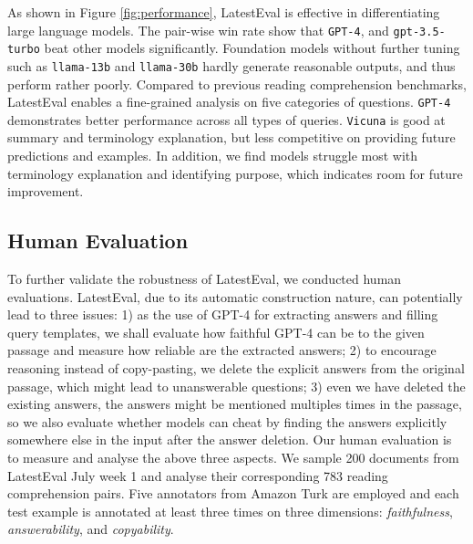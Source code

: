 \documentclass[letterpaper]{article} %
\begin{document}
As shown in Figure \ref{fig:performance}, LatestEval is effective in differentiating large language models. The pair-wise win rate show that \texttt{GPT-4}, and \texttt{gpt-3.5-turbo} beat other models significantly.
Foundation models without further tuning such as \texttt{llama-13b} and \texttt{llama-30b} hardly generate reasonable outputs, and thus perform rather poorly. Compared to previous reading comprehension benchmarks, LatestEval enables a fine-grained analysis on five categories of questions. \texttt{GPT-4} demonstrates better performance across all types of queries. \texttt{Vicuna} is good at summary and terminology explanation, but less competitive on providing future predictions and examples. In addition, we find models struggle most with terminology explanation and identifying purpose, which indicates room for future improvement.

\subsection{Human Evaluation}
To further validate the robustness of LatestEval, we conducted human evaluations.
LatestEval, due to its automatic construction nature, can potentially lead to three issues: 1) as the use of GPT-4 for extracting answers and filling query templates, we shall evaluate how faithful GPT-4 can be to the given passage and measure how reliable are the extracted answers; 2) to encourage reasoning instead of copy-pasting, we delete the explicit answers from the original passage, which might lead to unanswerable questions; 3) even we have deleted the existing answers, the answers might be mentioned multiples times in the passage, so we also evaluate whether models can cheat by finding the answers explicitly somewhere else in the input after the answer deletion.
Our human evaluation is to measure and analyse the above three aspects. We sample 200 documents from LatestEval July week 1 and analyse their corresponding 783 reading comprehension pairs. Five annotators from Amazon Turk are employed and each test example is annotated at least three times on three dimensions: \textit{faithfulness}, \textit{answerability}, and \textit{copyability}.
\end{document}
